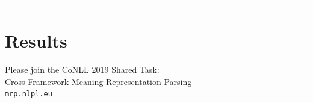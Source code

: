 \documentclass[extrafontsizes,60pt,twocolumn]{memoir}
\begin{document}
\vfill
\hrule


\section*{Results}



\begin{minipage}{.5\columnwidth}
\color{DarkSlateGray}
\tiny
\setlength\bibitemsep{0pt}


\end{minipage}
\begin{minipage}{.5\columnwidth}
\color{Black}
\begin{adjustbox}{margin=3mm,frame,minipage=1.15\columnwidth}
\centering\Large
Please join the CoNLL 2019 Shared Task: \\
Cross-Framework Meaning Representation Parsing \\
\Large\texttt{{\color{violet}mrp}.{\color{red}nlpl}.{\color{blue}eu}}
\end{adjustbox}
\end{minipage}
\end{document}
